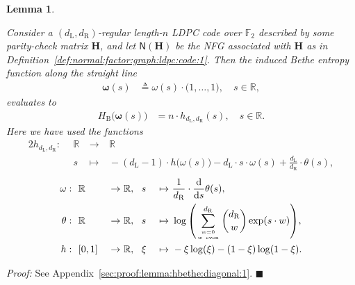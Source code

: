 \documentclass[journal, twocolumn]{IEEEtran}
\renewcommand{\mathbf}[1]{{\bm{#1}}}
\newcommand{\R}{\mathbb{R}}
\newcommand{\matr}[1]{\mathbf{#1}}
\newcommand{\graph}[1]{\mathsf{#1}}
\newcommand{\GF}[1]{\mathbb{F}_{#1}}
\newcommand{\defeq}{\triangleq}
\newcommand{\matrH}{\matr{H}}
\newcommand{\rdiff}[1]{\frac{\mathrm{d}}{\mathrm{d}#1}}
\newcommand{\vomega}{\boldsymbol{\omega}}
\newcommand{\dleft}{d_{\mathrm{L}}}
\newcommand{\dright}{d_{\mathrm{R}}}
\newcommand{\graphN}{\graph{N}}
\newcommand{\HBethe}{H_{\mathrm{B}}}
\newcommand{\?}{\mathrm{?}}
\newcommand{\qedblack}{\hspace*{\fill}%
  $\blacksquare$\smallskip}
\newtheorem{Lemma}{Lemma}
\newenvironment{Proof}%
  {\noindent \emph{Proof:}}{\qedblack}
\begin{document}
\begin{Lemma}
  \label{lemma:hbethe:diagonal:1}

  Consider a $(\dleft,\dright)$-regular length-$n$ LDPC code over $\GF{2}$
  described by some parity-check matrix $\matrH$, and let $\graphN(\matrH)$ be
  the NFG associated with $\matrH$ as in
  Definition~\ref{def:normal:factor:graph:ldpc:code:1}. Then the induced Bethe
  entropy function along the straight line
  \begin{align*}
    \vomega(s)
      &\defeq
         \omega(s)
         \cdot
         \big(
           1, \ldots, 1
         \big),
           \quad s \in \R,
  \end{align*}
  evaluates to
  \begin{align*}
    \HBethe\big( \vomega(s) \big)
      &= n
         \cdot
         h_{\dleft,\dright}(s),
           \quad s \in \R.
  \end{align*}
  Here we have used the functions
  \begin{alignat*}{2}
    h_{\dleft,\dright}: \
     &\ \R \ &\to     \ &\R \\
     &\ s  \ &\mapsto \
           &\! 
            -
            (\dleft \! - \! 1)
              \!
              \cdot
              \!
              h\big( \omega(s) \big)
            -
            \dleft
              \!
              \cdot
              \!
              s
              \!
              \cdot
              \!
              \omega(s)
            +
            \frac{\dleft}{\dright}
              \!
              \cdot
              \!
              \theta(s),
  \end{alignat*}
  \begin{alignat*}{3}
    \omega: \ 
      &\ \R \ &\to \     &\R, \ 
       \ s  \ &\mapsto \ &
               \frac{1}{\dright}
               \cdot
               \rdiff{s} \theta(s), \\
    \theta: \ 
      &\ \R \ &\to \     &\R, \ 
       \ s  \ &\mapsto \ &
               \log
                 \left(
                   \sum_{w = 0 \atop w \ \mathrm{even}}^{\dright}
                     {\dright \choose w}
                     \exp(s \cdot w)
                 \right) \! , \\
    h: \ &\ [0,1] \ &\to     \ &\R, \ 
         \ \xi   \ &\mapsto \ & - \xi \log(\xi) - (1-\xi) \log(1-\xi).
  \end{alignat*}
\end{Lemma}


\begin{Proof}
  See Appendix~\ref{sec:proof:lemma:hbethe:diagonal:1}.
\end{Proof}
\end{document}
